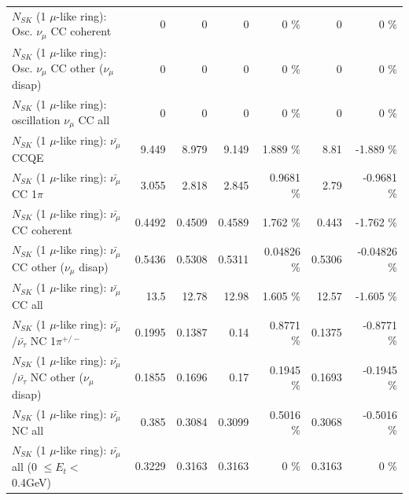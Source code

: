 \begin{table}
\begin{tabular}{| l | r | r | r  r | r  r |}
                        $N_{SK}$ (1 $\mu$-like ring): Osc. $\nu_\mu$ CC coherent &               0 &               0 &               0 &        0 \%  &               0 &        0 \%  \\ 
         $N_{SK}$ (1 $\mu$-like ring): Osc. $\nu_\mu$ CC other ($\nu_\mu$ disap) &               0 &               0 &               0 &        0 \%  &               0 &        0 \%  \\ 
                      $N_{SK}$ (1 $\mu$-like ring): oscillation $\nu_\mu$ CC all &               0 &               0 &               0 &        0 \%  &               0 &        0 \%  \\ 
\hline
\hline
                              $N_{SK}$ (1 $\mu$-like ring): $\bar{\nu_\mu}$ CCQE &           9.449 &           8.979 &           9.149 &    1.889 \%  &            8.81 &   -1.889 \%  \\ 
                         $N_{SK}$ (1 $\mu$-like ring): $\bar{\nu_\mu}$ CC 1$\pi$ &           3.055 &           2.818 &           2.845 &   0.9681 \%  &            2.79 &  -0.9681 \%  \\ 
                       $N_{SK}$ (1 $\mu$-like ring): $\bar{\nu_\mu}$ CC coherent &          0.4492 &          0.4509 &          0.4589 &    1.762 \%  &           0.443 &   -1.762 \%  \\ 
        $N_{SK}$ (1 $\mu$-like ring): $\bar{\nu_\mu}$ CC other ($\nu_\mu$ disap) &          0.5436 &          0.5308 &          0.5311 &  0.04826 \%  &          0.5306 & -0.04826 \%  \\ 
                          $N_{SK}$ (1 $\mu$-like ring): $\bar{\nu_{\mu}}$ CC all &            13.5 &           12.78 &           12.98 &    1.605 \%  &           12.57 &   -1.605 \%  \\ 
\hline
  $N_{SK}$ (1 $\mu$-like ring): $\bar{\nu_\mu}$/$\bar{\nu_\tau}$ NC 1$\pi^{+/-}$ &          0.1995 &          0.1387 &            0.14 &   0.8771 \%  &          0.1375 &  -0.8771 \%  \\ 
$N_{SK}$ (1 $\mu$-like ring): $\bar{\nu_\mu}$/$\bar{\nu_\tau}$ NC other ($\nu_\mu$ disap) &          0.1855 &          0.1696 &            0.17 &   0.1945 \%  &          0.1693 &  -0.1945 \%  \\ 
                          $N_{SK}$ (1 $\mu$-like ring): $\bar{\nu_{\mu}}$ NC all &           0.385 &          0.3084 &          0.3099 &   0.5016 \%  &          0.3068 &  -0.5016 \%  \\ 
\hline
   $N_{SK}$ (1 $\mu$-like ring): $\bar{\nu_{\mu}}$ all (0 $\leq E_{t} <$ 0.4GeV) &          0.3229 &          0.3163 &          0.3163 &        0 \%  &          0.3163 &        0 \%  \\ 

\end{tabular}
\end{table}
